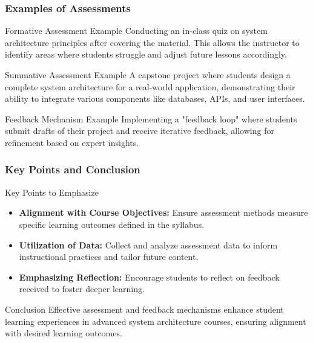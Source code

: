 \documentclass[aspectratio=169]{beamer}
\begin{document}
\begin{frame}[fragile]
    \frametitle{Examples of Assessments}
    \begin{block}{Formative Assessment Example}
        Conducting an in-class quiz on system architecture principles after covering the material. 
        This allows the instructor to identify areas where students struggle and adjust future lessons accordingly.
    \end{block}

    \begin{block}{Summative Assessment Example}
        A capstone project where students design a complete system architecture for a real-world application, demonstrating their ability to integrate various components like databases, APIs, and user interfaces.
    \end{block}

    \begin{block}{Feedback Mechanism Example}
        Implementing a "feedback loop" where students submit drafts of their project and receive iterative feedback, allowing for refinement based on expert insights.
    \end{block}
\end{frame}

\begin{frame}[fragile]
    \frametitle{Key Points and Conclusion}
    \begin{block}{Key Points to Emphasize}
        \begin{itemize}
            \item \textbf{Alignment with Course Objectives:} Ensure assessment methods measure specific learning outcomes defined in the syllabus.
            \item \textbf{Utilization of Data:} Collect and analyze assessment data to inform instructional practices and tailor future content.
            \item \textbf{Emphasizing Reflection:} Encourage students to reflect on feedback received to foster deeper learning.
        \end{itemize}
    \end{block}

    \begin{block}{Conclusion}
        Effective assessment and feedback mechanisms enhance student learning experiences in advanced system architecture courses, ensuring alignment with desired learning outcomes.
    \end{block}
\end{frame}
\end{document}
